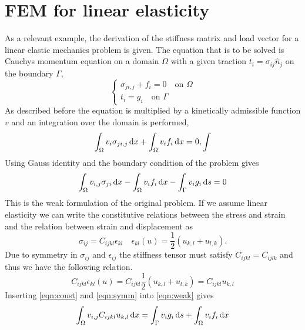 \documentclass[fem.tex]{subfiles}
\begin{document}
\section{FEM for linear elasticity}
As a relevant example, the derivation of the stiffness matrix and load vector for a linear elastic mechanics problem is given. The equation that is to be solved is Cauchys momentum equation on a domain $\Omega$ with a given traction $t_i = \sigma_{ij} \hat{n}_j$ on the boundary $\Gamma$,
\begin{equation} 
\left\{
\begin{array}{ll}
   \sigma_{ji,j} + f_i = 0 \quad \text{on } \Omega \\
   t_i = g_i \quad \text{on } \Gamma \end{array} \right.
    \label{eqn:cond}
\end{equation}
%
As described before the equation is multiplied by a kinetically admissible function $v$ and an integration over the domain is performed,
%
\begin{equation} 
  \int_\Omega  v_i\sigma_{ji,j} \, \mathrm{d} x + \int_\Omega v_i f_i \, \mathrm{d} x = 0, 
  \int
    \label{eqn:cond}
\end{equation}
%
Using Gauss identity and the boundary condition of the problem gives
%
\begin{equation} 
  \int_\Omega  v_{i,j} \sigma_{ji} \, \mathrm{d} x  - \int_\Omega v_i f_i \, \mathrm{d} x - \int_\Gamma v_i g_i \, \mathrm{d} s = 0
    \label{eqn:weak}
\end{equation}
%
 This is the weak formulation of the original problem. If we assume linear elasticity we can write the constitutive relations between the stress and strain and the relation between strain and displacement as
%
\begin{equation}
\label{eqn:const} 
\sigma_{ij} = C_{ijkl} \epsilon_{kl} \quad  \epsilon_{kl}(u) = \frac{1}{2} \left(u_{k,l} + u_{l,k}\right). 
\end{equation}
%
Due to symmetry in $\sigma_{ij}$ and $\epsilon_{ij}$ the stiffness tensor must satisfy $C_{ijkl} = C_{ijlk}$ and thus we have the following relation.
%
\begin{equation}
\label{eqn:symm}
 C_{ijkl}\epsilon_{kl} (u) = C_{ijkl}\frac{1}{2} \left(u_{k,l} + u_{l,k}\right) = C_{ijkl}u_{k,l} 
\end{equation}
%
Inserting \ref{eqn:const} and \ref{eqn:symm} into \ref{eqn:weak} gives
%
\begin{equation} 
  \int_\Omega  v_{i,j} C_{ijkl} u_{k,l} \, \mathrm{d} x = \int_\Gamma v_i g_i \, \mathrm{d} s + \int_\Omega v_i f_i \, \mathrm{d} x
    \label{eqn:weak_2}
\end{equation}
\end{document}
